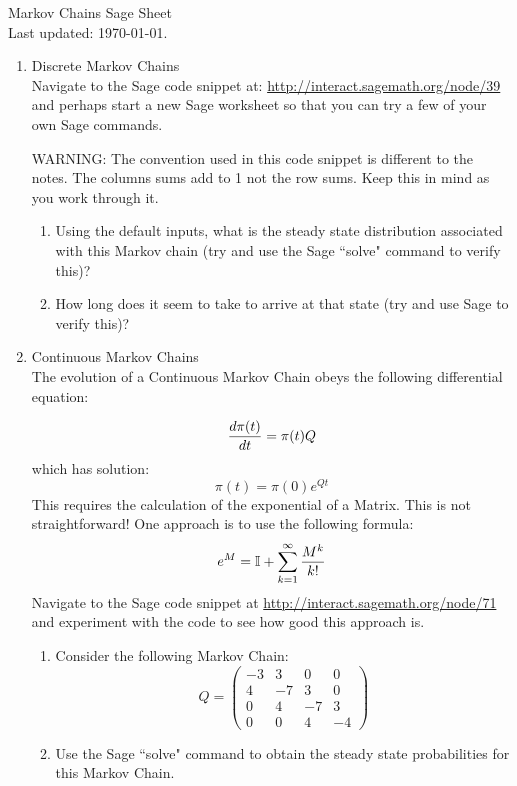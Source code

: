\documentclass[12pt]{article}
\begin{document}
\begin{center}
\Huge{Markov Chains Sage Sheet}\\
\tiny{Last updated: \today.}
\end{center}

\begin{enumerate}
\item Discrete Markov Chains\\
Navigate to the Sage code snippet at: \url{http://interact.sagemath.org/node/39} and perhaps start a new Sage worksheet so that you can try a few of your own Sage commands.

WARNING: The convention used in this code snippet is different to the notes. The columns sums add to 1 not the row sums. Keep this in mind as you work through it.

\begin{enumerate}
\item Using the default inputs, what is the steady state distribution associated with this Markov chain (try and use the Sage ``solve" command to verify this)?
\item How long does it seem to take to arrive at that state (try and use Sage to verify this)?
\end{enumerate}
\item Continuous Markov Chains\\
The evolution of a Continuous Markov Chain obeys the following differential equation:

$${d\pi(t)\over dt}=\pi(t)Q$$
which has solution:
$$\pi(t)=\pi(0)e^{Qt}$$
This requires the calculation of the exponential of a Matrix. This is not straightforward! One approach is to use the following formula:
$$
e^{M}=\mathbb{I}+\sum_{k=1}^{\infty}{M^k\over k!}
$$
Navigate to the Sage code snippet at \url{http://interact.sagemath.org/node/71} and experiment with the code to see how good this approach is.
\begin{enumerate}
\item Consider the following Markov Chain:
$$Q=\begin{pmatrix}
-3&3&0&0\\
4&-7&3&0\\
0&4&-7&3\\
0&0&4&-4
\end{pmatrix}$$
\item Use the Sage ``solve" command to obtain the steady state probabilities for this Markov Chain.
\end{enumerate}
\end{enumerate}
\end{document}
